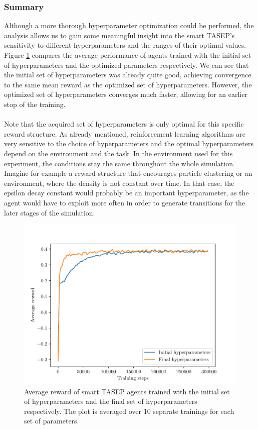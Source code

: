 \subsubsection{Summary}
Although a more thorough hyperparameter optimization could be performed, the analysis allows us to gain some meaningful insight into the smart TASEP's sensitivity to different hyperparameters and the ranges of their optimal values. Figure \ref{fig:hyperparam_optim_final_vs_initial} compares the average performance of agents trained with the initial set of hyperparameters and the optimized parameters respectively. We can see that the initial set of hyperparameters was already quite good, achieving convergence to the same mean reward as the optimized set of hyperparameters. However, the optimized set of hyperparameters converges much faster, allowing for an earlier stop of the training.
\\
\\
Note that the acquired set of hyperparameters is only optimal for this specific reward structure. As already mentioned, reinforcement learning algorithms are very sensitive to the choice of hyperparameters and the optimal hyperparameters depend on the environment and the task. In the environment used for this experiment, the conditions stay the same throughout the whole simulation. Imagine for example a reward structure that encourages particle clustering or an environment, where the density is not constant over time. In that case, the epsilon decay constant would probably be an important hyperparameter, as the agent would have to exploit more often in order to generate transitions for the later stages of the simulation. 
\begin{figure}[h]
    \centering
    \includegraphics[width=\textwidth]{hyperparam_optim_initial_vs_final.pdf}
    \caption{Average reward of smart TASEP agents trained with the initial set of hyperparameters and the final set of hyperparameters respectively. The plot is averaged over 10 separate trainings for each set of parameters.}
    \label{fig:hyperparam_optim_final_vs_initial}
\end{figure}